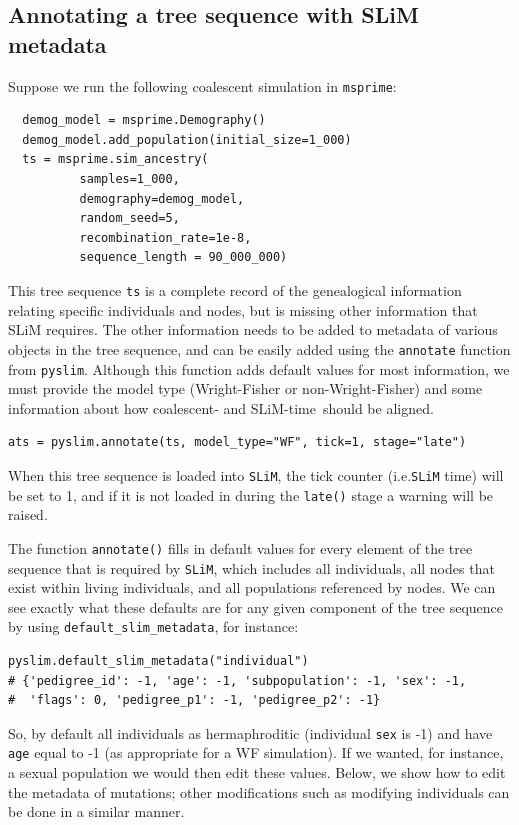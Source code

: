 \documentclass[12pt]{article}
\newcommand{\msprime}[0]{\texttt{msprime}\xspace}
\newcommand{\slim}[0]{\texttt{SLiM}\xspace}
\newcommand{\pyslim}[0]{\texttt{pyslim}\xspace}
\newcommand*{\ie}{i.e.\xcomma}
\begin{document}
\subsection*{Annotating a tree sequence with SLiM metadata}

Suppose we run the following coalescent simulation in \msprime:
\begin{verbatim}
  demog_model = msprime.Demography()
  demog_model.add_population(initial_size=1_000)
  ts = msprime.sim_ancestry(
          samples=1_000,
          demography=demog_model,
          random_seed=5,
          recombination_rate=1e-8,
          sequence_length = 90_000_000)
\end{verbatim}
This tree sequence \verb|ts| is a complete record of the genealogical information relating specific individuals
and nodes, but is missing other information that  SLiM requires.
The other information needs to be added to metadata of various objects in the tree sequence,
and can be easily added using the \verb|annotate| function from \pyslim.
Although this function adds default values for most information,
we must provide the model type (Wright-Fisher or non-Wright-Fisher)
and some information about how coalescent- and SLiM-time\ should be aligned.
\begin{verbatim}
ats = pyslim.annotate(ts, model_type="WF", tick=1, stage="late")
\end{verbatim}
When this tree sequence is loaded into \slim, the tick counter (\ie \slim time)
will be set to 1, and if it is not loaded in during the \verb|late()| stage a warning will be raised.

The function \verb|annotate()| fills in default values for every element of the tree sequence that is required by \slim,
which includes all individuals, all nodes that exist within living individuals, and all
populations referenced by nodes. We can see exactly what these defaults
are for any given component of the tree sequence by using \verb|default_slim_metadata|,
for instance:
\begin{verbatim}
pyslim.default_slim_metadata("individual")
# {'pedigree_id': -1, 'age': -1, 'subpopulation': -1, 'sex': -1,
#  'flags': 0, 'pedigree_p1': -1, 'pedigree_p2': -1}
\end{verbatim}
So, by default all individuals as hermaphroditic (individual \verb|sex| is -1)
and have \verb|age| equal to -1 (as appropriate for a WF simulation).
If we wanted, for instance, a sexual population we would then edit these values.
Below, we show how to edit the metadata of mutations; other modifications such as modifying individuals
can be done in a similar manner.
\end{document}
